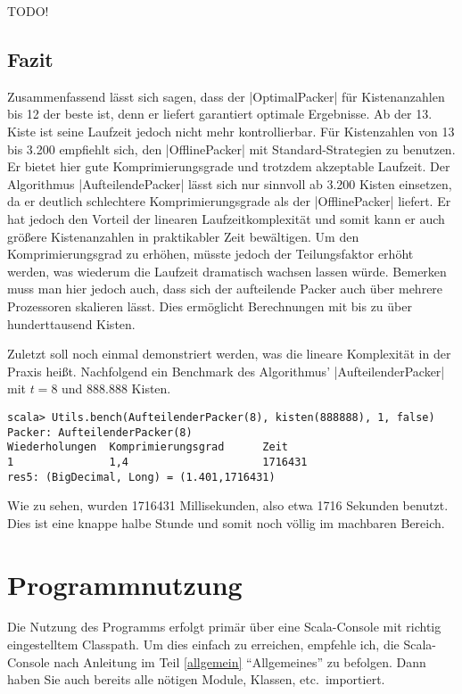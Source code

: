  TODO!

\subsection{Fazit}
Zusammenfassend lässt sich sagen, dass der |OptimalPacker| für Kistenanzahlen bis 12 der beste ist, denn er liefert garantiert optimale Ergebnisse.
Ab der 13. Kiste ist seine Laufzeit jedoch nicht mehr kontrollierbar.
Für Kistenzahlen von 13 bis 3.200 empfiehlt sich, den |OfflinePacker| mit Standard-Strategien zu benutzen.
Er bietet hier gute Komprimierungsgrade und trotzdem akzeptable Laufzeit.
Der Algorithmus |AufteilendePacker| lässt sich nur sinnvoll ab 3.200 Kisten einsetzen, da er deutlich schlechtere Komprimierungsgrade als der |OfflinePacker| liefert.
Er hat jedoch den Vorteil der linearen Laufzeitkomplexität und somit kann er auch größere Kistenanzahlen in praktikabler Zeit bewältigen.
Um den Komprimierungsgrad zu erhöhen, müsste jedoch der Teilungsfaktor erhöht werden, was wiederum die Laufzeit dramatisch wachsen lassen würde.
Bemerken muss man hier jedoch auch, dass sich der aufteilende Packer auch über mehrere Prozessoren skalieren lässt.
Dies ermöglicht Berechnungen mit bis zu über hunderttausend Kisten.

Zuletzt soll noch einmal demonstriert werden, was die lineare Komplexität in der Praxis heißt.
Nachfolgend ein Benchmark des Algorithmus' |AufteilenderPacker| mit $t=8$ und 888.888 Kisten.
\begin{lstlisting}
scala> Utils.bench(AufteilenderPacker(8), kisten(888888), 1, false)
Packer: AufteilenderPacker(8)
Wiederholungen  Komprimierungsgrad      Zeit
1               1,4                     1716431
res5: (BigDecimal, Long) = (1.401,1716431)
\end{lstlisting}
Wie zu sehen, wurden 1716431 Millisekunden, also etwa 1716 Sekunden benutzt. Dies ist eine knappe halbe Stunde und somit noch völlig im machbaren Bereich.
\clearpage
\section{Programmnutzung}
\lstset{basicstyle=\ttfamily}
Die Nutzung des Programms erfolgt primär über eine Scala-Console mit richtig eingestelltem Classpath.
Um dies einfach zu erreichen, empfehle ich, die Scala-Console nach Anleitung im Teil \ref{allgemein} ``Allgemeines'' zu befolgen.
Dann haben Sie auch bereits alle nötigen Module, Klassen, etc.\ importiert.


